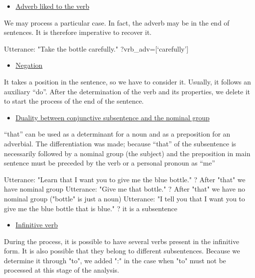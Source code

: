 \documentclass[twoside,a4paper,10pt]{report}
\begin{document}
\begin{itemize}
    \item  \underline{Adverb liked to the verb}
\end{itemize}
We may process a particular case. In fact, the adverb may be in the end of sentences. It is therefore imperative to recover it.


\small
\begin{verbatimtab}
  Utterance: "Take the bottle carefully."
  ?vrb_adv=[‘carefully’]
\end{verbatimtab}
\normalsize

\begin{itemize}
    \item  \underline{Negation}
\end{itemize}
It takes a position in the sentence, so we have to consider it. Usually, it follows an auxiliary “do”. After the determination of the verb and its properties, we delete it to start the process of the end of the sentence.



\begin{itemize}
    \item  \underline{Duality between conjunctive subsentence and the nominal group}
\end{itemize}
“that” can be used as a determinant for a noun and as a preposition for an adverbial. The differentiation was made; because “that” of the subsentence is necessarily followed by a nominal group (the subject) and the preposition in main sentence must be preceded by the verb or a personal pronoun as “me”


\small
\begin{verbatimtab}
  Utterance: "Learn that I want you to give me the blue bottle." ? After "that" we have nominal
group
  Utterance: "Give me that bottle." ? After "that" we have no nominal group ("bottle" is just a
noun)
  Utterance: "I tell you that I want you to give me the blue bottle that is blue." ? it is a
subsentence
\end{verbatimtab}
\normalsize

\begin{itemize}
    \item  \underline{Infinitive verb}
\end{itemize}
During the process, it is possible to have several verbs present in the infinitive form. It is also possible that they belong to different subsentences. Because we determine it through "to", we added ":" in the case when "to" must not be processed at this stage of the analysis.
\end{document}
